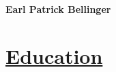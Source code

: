 \iffalse
\begin{wrapfigure}[0]{r}{0.3\textwidth} 
    \centering
    \vspace*{-2.95cm}
    \tikz\node[circle,draw,minimum size=3.5cm,
                path picture={
                    \node at (path picture bounding box.center){
                        \texttt{[image: avatar2.jpg]}
                    };
                }]{};
\end{wrapfigure}
\fi

{\Large\textbf{Earl Patrick Bellinger}}

  \section*{\sc\underline{Education}}
  \vspace*{-2mm}


